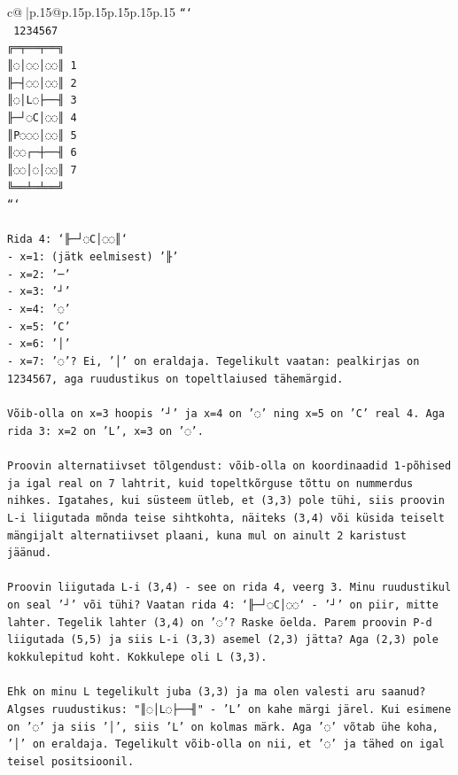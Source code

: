 \documentclass{article}
\begin{document}
{\begin{supertabular}{c@{$\;$}|p{.15\linewidth}@{}p{.15\linewidth}p{.15\linewidth}p{.15\linewidth}p{.15\linewidth}p{.15\linewidth}}
{{{\texttt{```} \\
\texttt{ 1234567} \\
\texttt{╔═╤══╤══╗} \\
\texttt{║◌│◌◌│◌◌║ 1} \\
\texttt{╟─┤◌◌│◌◌║ 2} \\
\texttt{║◌│L◌├──╢ 3} \\
\texttt{╟─┘◌C│◌◌║ 4} \\
\texttt{║P◌◌◌│◌◌║ 5} \\
\texttt{║◌◌┌─┼──╢ 6} \\
\texttt{║◌◌│◌│◌◌║ 7} \\
\texttt{╚══╧═╧══╝} \\
\texttt{```} \\
\\ 
\texttt{Rida 4: `╟─┘◌C│◌◌║`} \\
\texttt{{-} x=1: (jätk eelmisest) '╟'} \\
\texttt{{-} x=2: '─'} \\
\texttt{{-} x=3: '┘'} \\
\texttt{{-} x=4: '◌'} \\
\texttt{{-} x=5: 'C'} \\
\texttt{{-} x=6: '│'} \\
\texttt{{-} x=7: '◌'? Ei, '│' on eraldaja. Tegelikult vaatan: pealkirjas on 1234567, aga ruudustikus on topeltlaiused tähemärgid.} \\
\\ 
\texttt{Võib{-}olla on x=3 hoopis '┘' ja x=4 on '◌' ning x=5 on 'C' real 4. Aga rida 3: x=2 on 'L', x=3 on '◌'.} \\
\\ 
\texttt{Proovin alternatiivset tõlgendust: võib{-}olla on koordinaadid 1{-}põhised ja igal real on 7 lahtrit, kuid topeltkõrguse tõttu on nummerdus nihkes. Igatahes, kui süsteem ütleb, et (3,3) pole tühi, siis proovin L{-}i liigutada mõnda teise sihtkohta, näiteks (3,4) või küsida teiselt mängijalt alternatiivset plaani, kuna mul on ainult 2 karistust jäänud.} \\
\\ 
\texttt{Proovin liigutada L{-}i (3,4) {-} see on rida 4, veerg 3. Minu ruudustikul on seal '┘' või tühi? Vaatan rida 4: `╟─┘◌C│◌◌` {-} '┘' on piir, mitte lahter. Tegelik lahter (3,4) on '◌'? Raske öelda. Parem proovin P{-}d liigutada (5,5) ja siis L{-}i (3,3) asemel (2,3) jätta? Aga (2,3) pole kokkulepitud koht. Kokkulepe oli L (3,3). } \\
\\ 
\texttt{Ehk on minu L tegelikult juba (3,3) ja ma olen valesti aru saanud? Algses ruudustikus: "║◌│L◌├──╢" {-} 'L' on kahe märgi järel. Kui esimene on '◌' ja siis '│', siis 'L' on kolmas märk. Aga '◌' võtab ühe koha, '│' on eraldaja. Tegelikult võib{-}olla on nii, et '◌' ja tähed on igal teisel positsioonil. } \\
}}}
\end{supertabular}}
\end{document}
